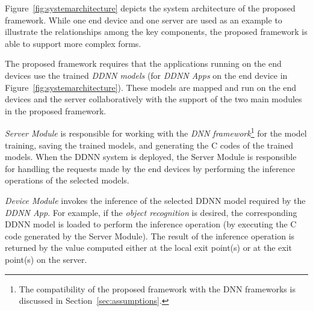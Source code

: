 \documentclass[format=acmsmall, review=false, screen=true]{acmart}
\def\figurename{Figure}
\def\sectionname{Section}
\begin{document}



\figurename~\ref{fig:systemarchitecture} depicts the system architecture of the proposed framework. While one end device and one server are used as an example to illustrate the relationships among the key components, the proposed framework is able to support more complex forms.

The proposed framework requires that the applications running on the end devices use the trained \emph{DDNN models} (for \emph{DDNN Apps} on the end device in \figurename~\ref{fig:systemarchitecture}). These models are mapped and run on the end devices and the server collaboratively with the support of the two main modules in the proposed framework.

\emph{Server Module} is responsible for working with the \emph{DNN framework}\footnote{The compatibility of the proposed framework with the DNN frameworks is discussed in \sectionname~\ref{sec:assumptions}.} for the model training, saving the trained models, and generating the C codes of the trained models. When the DDNN system is deployed, the Server Module is responsible for handling the requests made by the end devices by performing the inference operations of the selected models.


\emph{Device Module} invokes the inference of the selected DDNN model required by the \emph{DDNN App}. For example, if the \emph{object recognition} is desired, the corresponding DDNN model is loaded to perform the inference operation (by executing the C code generated by the Server Module). The result of the inference operation is returned by the value computed either at the local exit point(s) or at the exit point(s) on the server.
\end{document}
